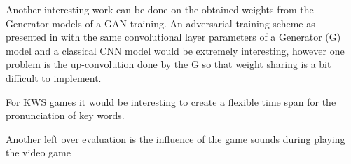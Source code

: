 Another interesting work can be done on the obtained weights from the Generator models of a GAN training. 
An adversarial training scheme as presented in \cite{Oezdenizci2020} with the same convolutional layer parameters of a Generator (G) model and a classical CNN model would be extremely interesting, however one problem is the up-convolution done by the G so that weight sharing is a bit difficult to implement.

For KWS games it would be interesting to create a flexible time span for the pronunciation of key words.

Another left over evaluation is the influence of the game sounds during playing the video game